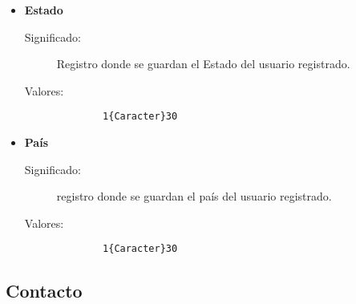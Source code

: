 \begin{itemize}
  \item \textbf{Estado}\label{dd:edoC}
    \begin{description}
      \item [Significado:] Registro donde se guardan el Estado del usuario registrado.
      \item [Valores:]{\begin{lstlisting}
        1{Caracter}30\end{lstlisting}}
    \end{description}

  \item \textbf{País}\label{dd:paisC}
    \begin{description}
      \item [Significado:] registro donde se guardan el país del usuario registrado.
      \item [Valores:]{\begin{lstlisting}
        1{Caracter}30\end{lstlisting}}
    \end{description}
\end{itemize}


\subsection{Contacto}
\label{dd:Contactos}
